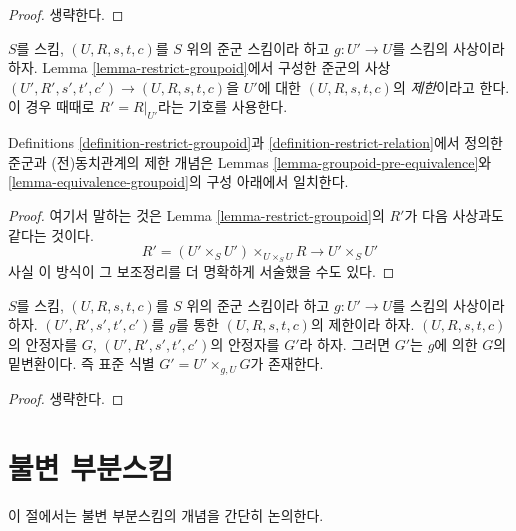 \begin{proof}
생략한다.
\end{proof}

\begin{definition}
\label{definition-restrict-groupoid}
$S$를 스킴, $(U, R, s, t, c)$를 $S$ 위의 준군 스킴이라 하고 $g : U' \to U$를 스킴의 사상이라 하자.
Lemma \ref{lemma-restrict-groupoid}에서 구성한 준군의 사상
$(U', R', s', t', c') \to (U, R, s, t, c)$을 $U'$에 대한 $(U, R, s, t, c)$의 {\it 제한}이라고 한다.
이 경우 때때로 $R' = R|_{U'}$라는 기호를 사용한다.
\end{definition}

\begin{lemma}
\label{lemma-restrict-groupoid-relation}
Definitions \ref{definition-restrict-groupoid}과 \ref{definition-restrict-relation}에서 정의한 준군과
(전)동치관계의 제한 개념은 Lemmas \ref{lemma-groupoid-pre-equivalence}와
\ref{lemma-equivalence-groupoid}의 구성 아래에서 일치한다.
\end{lemma}

\begin{proof}
여기서 말하는 것은 Lemma \ref{lemma-restrict-groupoid}의 $R'$가 다음 사상과도 같다는 것이다.
$$
R' = (U' \times_S U')\times_{U \times_S U} R
\longrightarrow
U' \times_S U'
$$
사실 이 방식이 그 보조정리를 더 명확하게 서술했을 수도 있다.
\end{proof}

\begin{lemma}
\label{lemma-restrict-stabilizer}
$S$를 스킴, $(U, R, s, t, c)$를 $S$ 위의 준군 스킴이라 하고 $g : U' \to U$를 스킴의 사상이라 하자.
$(U', R', s', t', c')$를 $g$를 통한 $(U, R, s, t, c)$의 제한이라 하자. $(U, R, s, t, c)$의 안정자를 $G$,
$(U', R', s', t', c')$의 안정자를 $G'$라 하자. 그러면 $G'$는 $g$에 의한 $G$의 밑변환이다. 즉 표준 식별
$G' = U' \times_{g, U} G$가 존재한다.
\end{lemma}

\begin{proof}
생략한다.
\end{proof}






\section{불변 부분스킴}
\label{section-invariant}

\noindent
이 절에서는 불변 부분스킴의 개념을 간단히 논의한다.

